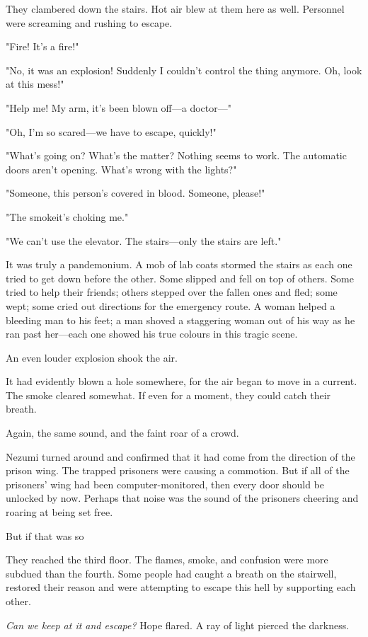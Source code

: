 They clambered down the stairs. Hot air blew at them here as well.
Personnel were screaming and rushing to escape.

"Fire! It's a fire!"

"No, it was an explosion! Suddenly I couldn't control the thing anymore.
Oh, look at this mess!"

"Help me! My arm, it's been blown off---a doctor---"

"Oh, I'm so scared---we have to escape, quickly!"

"What's going on? What's the matter? Nothing seems to work. The
automatic doors aren't opening. What's wrong with the lights?"

"Someone, this person's covered in blood. Someone, please!"

"The smoke\el it's choking me."

"We can't use the elevator. The stairs---only the stairs are left."

It was truly a pandemonium. A mob of lab coats stormed the stairs as
each one tried to get down before the other. Some slipped and fell on
top of others. Some tried to help their friends; others stepped over the
fallen ones and fled; some wept; some cried out directions for the
emergency route. A woman helped a bleeding man to his feet; a man shoved
a staggering woman out of his way as he ran past her---each one showed his
true colours in this tragic scene.

An even louder explosion shook the air.

It had evidently blown a hole somewhere, for the air began to move in a
current. The smoke cleared somewhat. If even for a moment, they could
catch their breath.

Again, the same sound, and the faint roar of a crowd.

Nezumi turned around and confirmed that it had come from the direction
of the prison wing. The trapped prisoners were causing a commotion. But
if all of the prisoners' wing had been computer-monitored, then every
door should be unlocked by now. Perhaps that noise was the sound of the
prisoners cheering and roaring at being set free.

But if that was so\el 

They reached the third floor. The flames, smoke, and confusion were more
subdued than the fourth. Some people had caught a breath on the
stairwell, restored their reason and were attempting to escape this hell
by supporting each other.

\emph{Can we keep at it and escape?} Hope flared. A ray of light pierced the
darkness.

